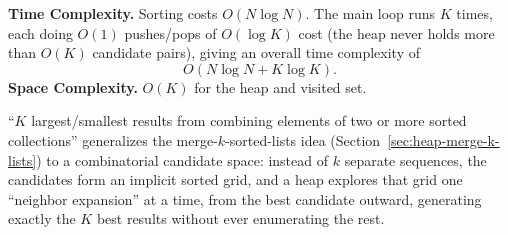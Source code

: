 \begin{complexitybox}
\textbf{Time Complexity.} Sorting costs $O(N \log N)$. The main loop runs
$K$ times, each doing $O(1)$ pushes/pops of $O(\log K)$ cost (the heap
never holds more than $O(K)$ candidate pairs), giving an overall time
complexity of
\[
  O(N \log N + K \log K).
\]
\textbf{Space Complexity.} $O(K)$ for the heap and visited set.
\end{complexitybox}

\begin{takeawaybox}
``$K$ largest/smallest results from combining elements of two or more
sorted collections'' generalizes the merge-$k$-sorted-lists idea
(Section~\ref{sec:heap-merge-k-lists}) to a combinatorial candidate space:
instead of $k$ separate sequences, the candidates form an implicit sorted
grid, and a heap explores that grid one ``neighbor expansion'' at a time,
from the best candidate outward, generating exactly the $K$ best results
without ever enumerating the rest.
\end{takeawaybox}
